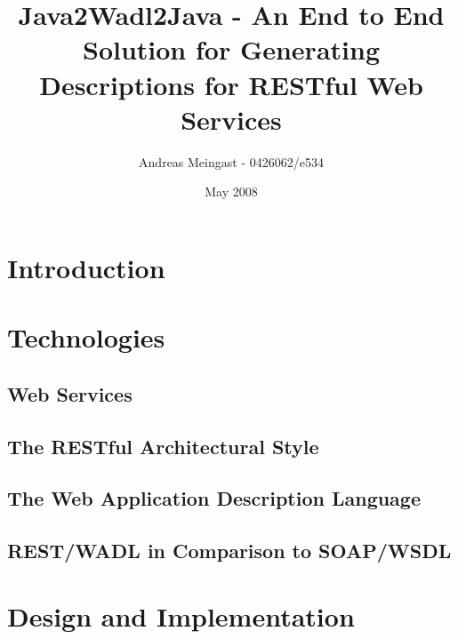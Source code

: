 \documentclass[a4paper,12pt]{article}
\begin{document}
\title{Java2Wadl2Java - An End to End Solution for Generating Descriptions for RESTful Web Services}
\author{Andreas Meingast - 0426062/e534}

\date{May 2008}

\maketitle

\vspace{6cm}

\begin{abstract}

\end{abstract}

\newpage

\tableofcontents

\newpage

\section{Introduction}


\section{Technologies}

\subsection{Web Services}


\subsection{The RESTful Architectural Style}


\subsection{The  Web Application Description Language}


\subsection{REST/WADL in Comparison to SOAP/WSDL}


\section{Design and Implementation}

\end{document}
